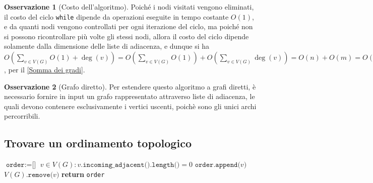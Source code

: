 \documentclass[14pt]{extreport}
\theoremstyle{definition}
\theoremstyle{definition}
\newtheorem{remark}{Osservazione}[subsection]
\begin{document}
\begin{remark}[Costo dell'algoritmo]
    \label{costo findReachableNodes2}
    Poiché i nodi visitati vengono eliminati, il costo del ciclo \texttt{while} dipende da operazioni eseguite in tempo costante $O(1)$, e da quanti nodi vengono controllati per ogni iterazione del ciclo, ma poiché non si possono ricontrollare più volte gli stessi nodi, allora il costo del ciclo dipende solamente dalla dimensione delle liste di adiacenza, e dunque si ha $\displaystyle O\left( \sum_{v \in V(G)}{O(1) + \deg(v)}\right)=O\left(\sum_{v \in V(G)}{O(1)}\right) + O\left(\sum_{v \in V(G)}{\deg(v)}\right) = O(n) + O(m) = O(n+ m)$, per il \cref{Somma dei gradi}.
\end{remark}

\begin{remark}[Grafo diretto]
    Per estendere questo algoritmo a grafi diretti, è necessario fornire in input un grafo rappresentato attraverso liste di adiacenza, le quali devono contenere esclusivamente i vertici uscenti, poichè sono gli unici archi percorribili.
\end{remark}

\subsection{Trovare un ordinamento topologico}

\begin{algorithm}[H]
    \caption{
        Dato un grafo diretto aciclico $G$, l'algoritmo restituisce un suo ordinamento topologico.\\
        \textbf{Input}: $G$ grafo diretto aciclico.\\
        \textbf{Output}: un ordinamento topologico di $G$.
    }

    \begin{algorithmic}[1]
            \State $\texttt{order} := \texttt{[}\texttt{]}$
                \State $v \in V(G) : v.\texttt{incoming\_adjacent().length()} = 0$
                \State $\texttt{order.append(}v\texttt{)}$
                \State $V(G)\texttt{.remove(}v\texttt{)}$
            \EndWhile
            \State \textbf{return} \texttt{order}
        \EndFunction
    \end{algorithmic}
\end{algorithm}
\end{document}
